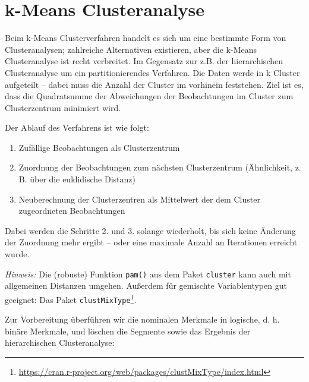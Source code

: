 \documentclass[12pt,ngerman,]{book}
\makeatletter
\newenvironment{Shaded}{\begin{snugshade}}{\end{snugshade}}
\newcommand{\KeywordTok}[1]{\textcolor[rgb]{0.13,0.29,0.53}{\textbf{{#1}}}}
\newcommand{\DataTypeTok}[1]{\textcolor[rgb]{0.13,0.29,0.53}{{#1}}}
\newcommand{\StringTok}[1]{\textcolor[rgb]{0.31,0.60,0.02}{{#1}}}
\newcommand{\NormalTok}[1]{{#1}}
\providecommand{\tightlist}{%
  \setlength{\itemsep}{0pt}\setlength{\parskip}{0pt}}
\let\rmarkdownfootnote\footnote%
\def\footnote{\protect\rmarkdownfootnote}
\renewcommand{\href}[2]{#2\footnote{\url{#1}}}
\newenvironment{kframe}{%
\medskip{}
\setlength{\fboxsep}{.8em}
 \def\at@end@of@kframe{}%
 \ifinner\ifhmode%
  \def\at@end@of@kframe{\end{minipage}}%
  \begin{minipage}{\columnwidth}%
 \fi\fi%
 \def\FrameCommand##1{\hskip\@totalleftmargin \hskip-\fboxsep
 \colorbox{shadecolor}{##1}\hskip-\fboxsep
     \hskip-\linewidth \hskip-\@totalleftmargin \hskip\columnwidth}%
 \MakeFramed {\advance\hsize-\width
   \@totalleftmargin\z@ \linewidth\hsize
   \@setminipage}}%
 {\par\unskip\endMakeFramed%
 \at@end@of@kframe}
\renewenvironment{Shaded}{\begin{kframe}}{\end{kframe}}
\makeatother
\begin{document}
\section{k-Means Clusteranalyse}\label{k-means-clusteranalyse}

Beim k-Means Clusterverfahren handelt es sich um eine bestimmte Form von
Clusteranalysen; zahlreiche Alternativen existieren, aber die k-Means
Clusteranalyse ist recht verbreitet. Im Gegensatz zur z.B. der
hierarchischen Clusteranalyse um ein partitionierendes Verfahren. Die
Daten werde in k Cluster aufgeteilt -- dabei muss die Anzahl der Cluster
im vorhinein feststehen. Ziel ist es, dass die Quadratsumme der
Abweichungen der Beobachtungen im Cluster zum Clusterzentrum minimiert
wird.

Der Ablauf des Verfahrens ist wie folgt:

\begin{enumerate}
\def\labelenumi{\arabic{enumi}.}
\tightlist
\item
  Zufällige Beobachtungen als Clusterzentrum
\item
  Zuordnung der Beobachtungen zum nächsten Clusterzentrum (Ähnlichkeit,
  z. B. über die euklidische Distanz)
\item
  Neuberechnung der Clusterzentren als Mittelwert der dem Cluster
  zugeordneten Beobachtungen
\end{enumerate}

Dabei werden die Schritte 2. und 3. solange wiederholt, bis sich keine
Änderung der Zuordnung mehr ergibt -- oder eine maximale Anzahl an
Iterationen erreicht wurde.

\emph{Hinweis:} Die (robuste) Funktion \texttt{pam()} aus dem Paket
\texttt{cluster} kann auch mit allgemeinen Distanzen umgehen. Außerdem
für gemischte Variablentypen gut geeignet: Das Paket
\href{https://cran.r-project.org/web/packages/clustMixType/index.html}{\texttt{clustMixType}}.

Zur Vorbereitung überführen wir die nominalen Merkmale in logische, d.
h. binäre Merkmale, und löschen die Segmente sowie das Ergebnis der
hierarchischen Clusteranalyse:

\begin{Shaded}
\end{Shaded}
\end{document}
